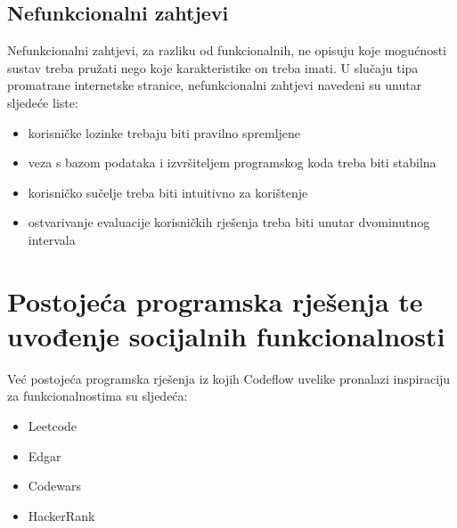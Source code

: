 \documentclass[times, utf8, zavrsni]{fer}
\begin{document}
		\section{Nefunkcionalni zahtjevi}
		Nefunkcionalni zahtjevi, za razliku od funkcionalnih, ne opisuju koje mogućnosti sustav treba pružati nego koje karakteristike on treba imati. U slučaju tipa promatrane internetske stranice, nefunkcionalni zahtjevi navedeni su unutar sljedeće liste:
		\begin{itemize}
			\item korisničke lozinke trebaju biti pravilno spremljene
			\item veza s bazom podataka i izvršiteljem programskog koda treba biti stabilna
			\item korisničko sučelje treba biti intuitivno za korištenje
			\item ostvarivanje evaluacije korisničkih rješenja treba biti unutar dvominutnog intervala 
		\end{itemize}
	
	\chapter{Postojeća programska rješenja te uvođenje socijalnih funkcionalnosti}
	Već postojeća programska rješenja iz kojih Codeflow uvelike pronalazi inspiraciju za funkcionalnostima su sljedeća:
	\begin{itemize}
		\item Leetcode
		\item Edgar
		\item Codewars
		\item HackerRank
	\end{itemize}
	
\end{document}
